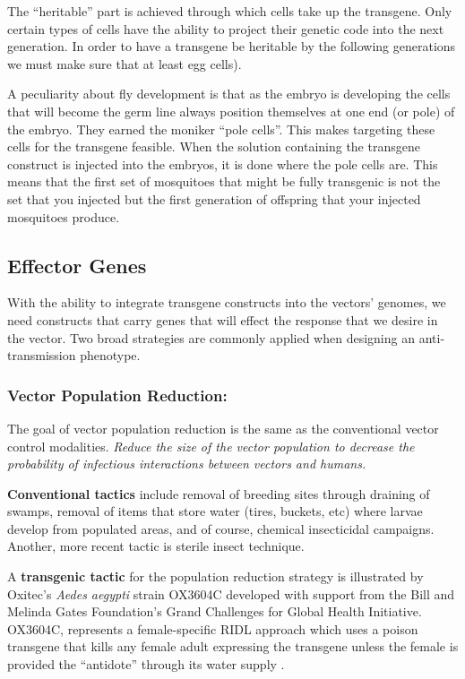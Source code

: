 The ``heritable'' part is achieved through which cells take up the transgene.
Only certain types of cells have the ability to project their genetic code into the next generation.
In order to have a transgene be heritable by the following generations we must make sure that at least egg cells).

A peculiarity about fly development is that as the embryo is developing the cells that will become the germ line always position themselves at one end (or pole) of the embryo.
They earned the moniker ``pole cells''.
This makes targeting these cells for the transgene feasible.
When the solution containing the transgene construct is injected into the embryos, it is done where the pole cells are.
This means that the first set of mosquitoes that might be fully transgenic is not the set that you injected but the first generation of offspring that your injected mosquitoes produce.

\subsection{Effector Genes}

With the ability to integrate transgene constructs into the vectors' genomes, we need constructs that carry genes that will effect the response that we desire in the vector.
Two broad strategies are commonly applied when designing an anti-transmission phenotype.

\subsubsection{Vector Population Reduction:}

The goal of vector population reduction is the same as the conventional vector control modalities.
\emph{Reduce the size of the vector population to decrease the probability of infectious interactions between vectors and humans.}

\textbf{Conventional tactics} include removal of breeding sites through draining of swamps, removal of items that store water (tires, buckets, etc) where larvae develop from populated areas, and of course, chemical insecticidal campaigns.
Another, more recent tactic is sterile insect technique.

A \textbf{transgenic tactic} for the population reduction strategy is illustrated by Oxitec's \emph{Aedes aegypti} strain OX3604C developed with support from the Bill and Melinda Gates Foundation's Grand Challenges for Global Health Initiative.
OX3604C, represents a female-specific \gls{RIDL} approach which uses a poison transgene that kills any female adult expressing the transgene unless the female is provided the ``antidote'' through its water supply \cite{WisedeValdez2011,Bargielowski2012,Facchinelli2013}.

